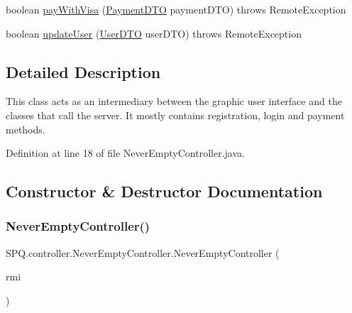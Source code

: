 \begin{DoxyCompactItemize}
\item 
boolean \mbox{\hyperlink{class_s_p_q_1_1controller_1_1_never_empty_controller_a79b4d6042b76ad3aee7f11d104d813d6}{pay\+With\+Visa}} (\mbox{\hyperlink{class_s_p_q_1_1dto_1_1_payment_d_t_o}{Payment\+D\+TO}} payment\+D\+TO)  throws Remote\+Exception 
\item 
boolean \mbox{\hyperlink{class_s_p_q_1_1controller_1_1_never_empty_controller_abac74fe36817d476abdd20d19df2092b}{update\+User}} (\mbox{\hyperlink{class_s_p_q_1_1dto_1_1_user_d_t_o}{User\+D\+TO}} user\+D\+TO)  throws Remote\+Exception 
\end{DoxyCompactItemize}


\subsection{Detailed Description}
This class acts as an intermediary between the graphic user interface and the classes that call the server. It mostly contains registration, login and payment methods. 

Definition at line 18 of file Never\+Empty\+Controller.\+java.



\subsection{Constructor \& Destructor Documentation}
\mbox{\label{class_s_p_q_1_1controller_1_1_never_empty_controller_ade8f8a56514a9ef3676a93c79b404be5}} 
\subsubsection{\texorpdfstring{Never\+Empty\+Controller()}{NeverEmptyController()}}
{\footnotesize\ttfamily S\+P\+Q.\+controller.\+Never\+Empty\+Controller.\+Never\+Empty\+Controller (\begin{DoxyParamCaption}\item[{\mbox{\hyperlink{class_s_p_q_1_1remote_1_1_r_m_i_service_locator}{R\+M\+I\+Service\+Locator}}}]{rmi }\end{DoxyParamCaption})}

